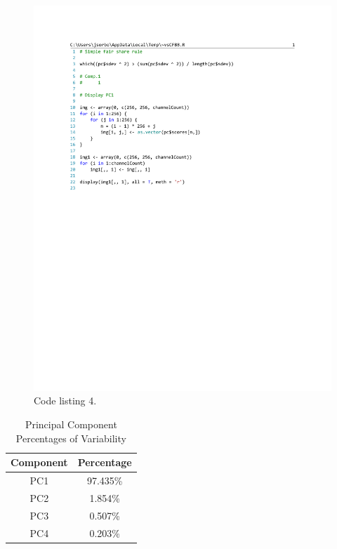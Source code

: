 \documentclass[conference,compsoc]{IEEEtran}
\begin{document}
\begin{figure}[!t]
\centering
\includegraphics[width=7in]{code-listing-4.pdf}
\caption{Code listing 4.}
\label{code-listing-4}
\end{figure}

\begin{table}[!t]
\renewcommand{\arraystretch}{1.3}
\caption{Principal Component Percentages of Variability}
\label{percentages}
\centering
\begin{tabular}{cc}
\hline
Component & Percentage\\
\hline
PC1 & 97.435\%\\
PC2 & 1.854\%\\
PC3 & 0.507\%\\
PC4 & 0.203\%\\
\hline
\end{tabular}
\end{table}
\end{document}
